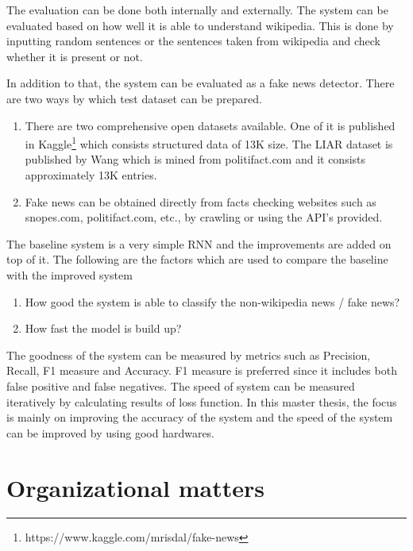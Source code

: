 \documentclass[a4paper, 11pt]{article}
\begin{document}
The evaluation can be done both internally and externally. The system can be evaluated based on how well it is able to understand wikipedia. This is done by inputting random sentences or the sentences taken from wikipedia and check whether it is present or not. 

In addition to that, the system can be evaluated as a fake news detector. There are two ways by which test dataset can be prepared. 

\begin{enumerate}
\item There are two comprehensive open datasets available. One of it is published in Kaggle\footnote{https://www.kaggle.com/mrisdal/fake-news} which consists structured data of 13K size. The LIAR dataset is published by Wang \cite{Wang2017} which is mined from politifact.com and it consists approximately 13K entries.
\item Fake news can be obtained directly from facts checking websites such as snopes.com, politifact.com, etc., by crawling or using the API's provided.
\end{enumerate}

The baseline system is a very simple RNN and the improvements are added on top of it. The following are the factors which are used to compare the baseline with the improved system
\begin{enumerate}
\item How good the system is able to classify the non-wikipedia news / fake news?
\item How fast the model is build up?
\end{enumerate}

The goodness of the system can be measured by metrics such as Precision, Recall, F1 measure and Accuracy. F1 measure is preferred since it includes both false positive and false negatives. The speed of system can be measured iteratively by calculating results of loss function. In this master thesis, the focus is mainly on improving the accuracy of the system and the speed of the system can be improved by using good hardwares. 

\newpage

\section{Organizational matters}
\end{document}
